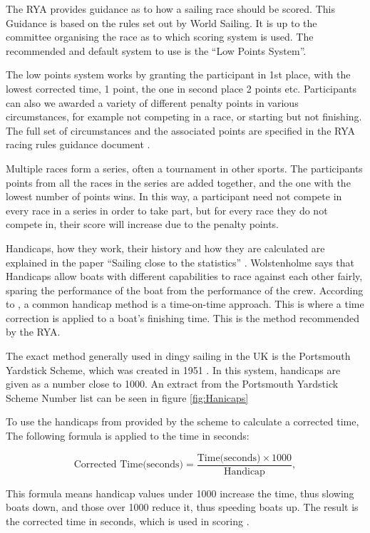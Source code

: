 \documentclass{l4proj}
\begin{document}
The RYA provides guidance as to how a sailing race should be scored. This Guidance is based on the rules set out by World Sailing. It is up to the committee organising the race as to which scoring system is used. The recommended and default system to use is the “Low Points System”.

The low points system works by granting the participant in 1st place, with the lowest corrected time, 1 point, the one in second place 2 points etc. Participants can also we awarded a variety of different penalty points in various circumstances, for example not competing in a race, or starting but not finishing. The full set of circumstances and the associated points are specified in the RYA racing rules guidance document \citet{RYAscore}.

Multiple races form a series, often a tournament in other sports. The participants points from all the races in the series are added together, and the one with the lowest number of points wins. In this way, a participant need not compete in every race in a series in order to take part, but for every race they do not compete in, their score will increase due to the penalty points.

Handicaps, how they work, their history and how they are calculated are explained in the paper “Sailing close to the statistics” \citep{hanicaps}. Wolstenholme says that Handicaps allow boats with different capabilities to race against each other fairly, sparing the performance of the boat from the performance of the crew. 
According to \citet{hanicaps}, a common handicap method is a time-on-time approach. This is where a time correction is applied to a boat’s finishing time. This is the method recommended by the RYA.

The exact method generally used in dingy sailing in the UK is the Portsmouth Yardstick Scheme, which was created in 1951 \citep{hanicaps}. In this system, handicaps are given as a number close to 1000. An extract from the Portsmouth Yardstick Scheme Number list \citep{RYApy} can be seen in figure \ref{fig:Hanicaps}

To use the handicaps from provided by the scheme to calculate a corrected time, The following formula is applied to the time in seconds:

\begin{equation}
    \text{Corrected Time(seconds)} = \frac{\text{Time(seconds)} \times 1000}{\text{Handicap}},
\end{equation}  

This formula means handicap values under 1000 increase the time, thus slowing boats down, and those over 1000 reduce it, thus speeding boats up. The result is the corrected time in seconds, which is used in scoring \citep{RYAscore}.
\end{document}
